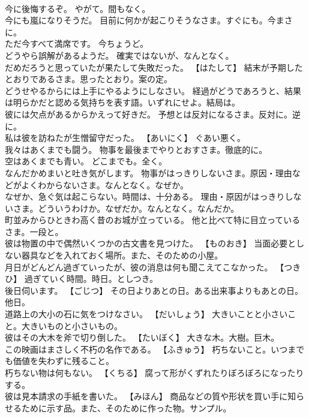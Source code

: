 \documentclass[8pt]{extreport}
\begin{document}
\begin{CJK}{UTF8}{min}
\\	今に後悔するぞ。	やがて。間もなく。
\\	今にも嵐になりそうだ。	目前に何かが起こりそうなさま。すぐにも。今まさに。
\\	ただ今すべて満席です。	今ちょうど。
\\	どうやら誤解があるようだ。	確実ではないが、なんとなく。
\\	だめだろうと思っていたが果たして失敗だった。	【はたして】 結末が予期したとおりであるさま。思ったとおり。案の定。
\\	どうせやるからには上手にやるようにしなさい。	経過がどうであろうと、結果は明らかだと認める気持ちを表す語。いずれにせよ。結局は。
\\	彼には欠点があるからかえって好きだ。	予想とは反対になるさま。反対に。逆に。
\\	私は彼を訪ねたが生憎留守だった。	【あいにく】 ぐあい悪く。
\\	我々はあくまでも闘う。	物事を最後までやりとおすさま。徹底的に。
\\	空はあくまでも青い。	どこまでも。全く。
\\	なんだかめまいと吐き気がします。	物事がはっきりしないさま。原因・理由などがよくわからないさま。なんとなく。なぜか。
\\	なぜか、急ぐ気は起こらない。時間は、十分ある。	理由・原因がはっきりしないさま。どういうわけか。なぜだか。なんとなく。なんだか。
\\	町並みからひときわ高く昔のお城が立っている。	他と比べて特に目立っているさま。一段と。
\\	彼は物置の中で偶然いくつかの古文書を見つけた。	【ものおき】 当面必要としない器具などを入れておく場所。また、そのための小屋。
\\	月日がどんどん過ぎていったが、彼の消息は何も聞こえてこなかった。	【つきひ】 過ぎていく時間。時日。としつき。
\\	後日伺います。	【ごじつ】 その日よりあとの日。ある出来事よりもあとの日。他日。
\\	道路上の大小の石に気をつけなさい。	【だいしょう】 大きいことと小さいこと。大きいものと小さいもの。
\\	彼はその大木を斧で切り倒した。	【たいぼく】 大きな木。大樹。巨木。
\\	この映画はまさしく不朽の名作である。	【ふきゅう】 朽ちないこと。いつまでも価値を失わずに残ること。
\\	朽ちない物は何もない。	【くちる】 腐って形がくずれたりぼろぼろになったりする。
\\	彼は見本請求の手紙を書いた。	【みほん】 商品などの質や形状を買い手に知らせるために示す品。また、そのために作った物。サンプル。

\end{CJK}
\end{document}
